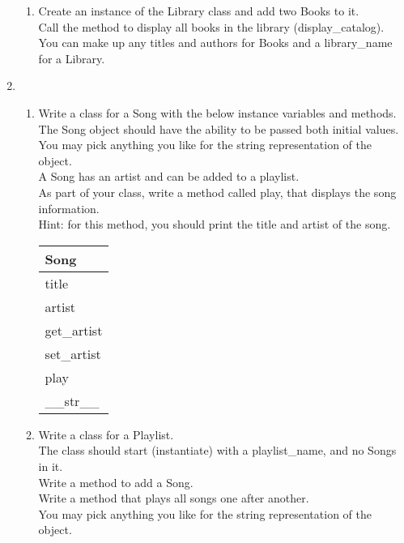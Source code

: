 \documentclass{article}
\begin{document}
\begin{enumerate}
\begin{enumerate}
		\item
			Create an instance of the Library class and add two Books to it.\\
			Call the method to display all books in the library (display\_catalog).\\
			You can make up any titles and authors for Books and a library\_name for a Library.\\
	\end{enumerate}
\pagebreak



	\item
	\begin{enumerate}
		\item
			Write a class for a Song with the below instance variables and methods.\\ 
			The Song object should have the ability to be passed both initial values.\\  
			You may pick anything you like for the string representation of the object.\\
			A Song has an artist and can be added to a playlist.\\  
			As part of your class, write a method called play, that displays the song information.\\
			Hint: for this method, you should print the title and artist of the song.
			\begin{flushright}
			\begin{tabular}{|l|}
				\hline
				Song\\ \hline
				title \\	artist\\	 \hline
				get\_artist \\ set\_artist \\ play \\ \_\_str\_\_ \\ \hline
			\end{tabular}
			\end{flushright}

		\item
			Write a class for a Playlist. \\
			The class should start (instantiate) with a playlist\_name, and no Songs in it. \\ 
			Write a method to add a Song.\\
			Write a method that plays all songs one after another.\\
			You may pick anything you like for the string representation of the object.
	

\end{enumerate}
\end{enumerate}
\end{document}
